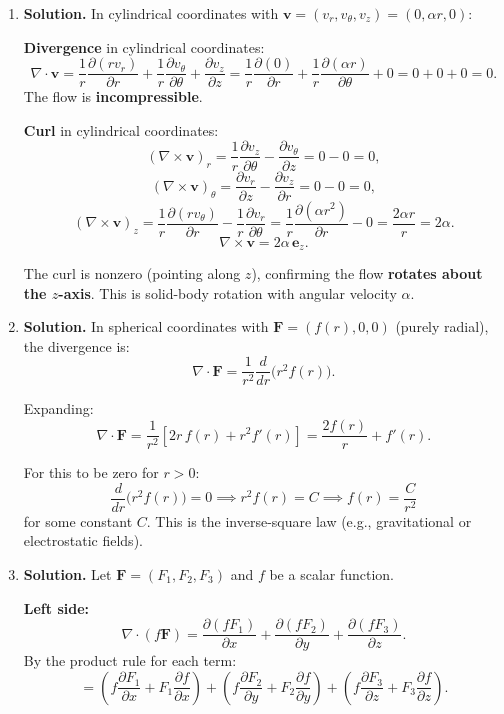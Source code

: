 \begin{enumerate}
\emph{Note:} The problem statement suggests the curl is nonzero, but computation shows both are zero. The field is both divergence-free and irrotational.

\item \textbf{Solution.}
In cylindrical coordinates with $\mathbf{v}=(v_r, v_\theta, v_z)=(0,\alpha r, 0)$:

\textbf{Divergence} in cylindrical coordinates:
\[
\nabla\cdot\mathbf{v} = \frac{1}{r}\frac{\partial(rv_r)}{\partial r}+\frac{1}{r}\frac{\partial v_\theta}{\partial\theta}+\frac{\partial v_z}{\partial z} = \frac{1}{r}\frac{\partial(0)}{\partial r}+\frac{1}{r}\frac{\partial(\alpha r)}{\partial\theta}+0 = 0+0+0 = \boxed{0}.
\]
The flow is \textbf{incompressible}.

\textbf{Curl} in cylindrical coordinates:
\[
(\nabla\times\mathbf{v})_r = \frac{1}{r}\frac{\partial v_z}{\partial\theta}-\frac{\partial v_\theta}{\partial z} = 0-0=0,
\]
\[
(\nabla\times\mathbf{v})_\theta = \frac{\partial v_r}{\partial z}-\frac{\partial v_z}{\partial r} = 0-0=0,
\]
\[
(\nabla\times\mathbf{v})_z = \frac{1}{r}\frac{\partial(rv_\theta)}{\partial r}-\frac{1}{r}\frac{\partial v_r}{\partial\theta} = \frac{1}{r}\frac{\partial(\alpha r^2)}{\partial r}-0 = \frac{2\alpha r}{r} = 2\alpha.
\]
\[
\nabla\times\mathbf{v} = \boxed{2\alpha\,\mathbf{e}_z}.
\]

The curl is nonzero (pointing along $z$), confirming the flow \textbf{rotates about the $z$-axis}. This is solid-body rotation with angular velocity $\alpha$.

\item \textbf{Solution.}
In spherical coordinates with $\mathbf{F}=(f(r),0,0)$ (purely radial), the divergence is:
\[
\nabla\cdot\mathbf{F} = \frac{1}{r^2}\frac{d}{dr}\bigl(r^2 f(r)\bigr).
\]

Expanding:
\[
\nabla\cdot\mathbf{F} = \frac{1}{r^2}\left[2r\,f(r)+r^2 f'(r)\right] = \frac{2f(r)}{r}+f'(r).
\]

For this to be zero for $r>0$:
\[
\frac{d}{dr}\bigl(r^2 f(r)\bigr)=0 \implies r^2 f(r)=C \implies \boxed{f(r)=\frac{C}{r^2}}
\]
for some constant $C$. This is the inverse-square law (e.g., gravitational or electrostatic fields).

\item \textbf{Solution.}
Let $\mathbf{F}=(F_1,F_2,F_3)$ and $f$ be a scalar function.

\textbf{Left side:}
\[
\nabla\cdot(f\mathbf{F}) = \frac{\partial(fF_1)}{\partial x}+\frac{\partial(fF_2)}{\partial y}+\frac{\partial(fF_3)}{\partial z}.
\]
By the product rule for each term:
\[
= \left(f\frac{\partial F_1}{\partial x}+F_1\frac{\partial f}{\partial x}\right)+\left(f\frac{\partial F_2}{\partial y}+F_2\frac{\partial f}{\partial y}\right)+\left(f\frac{\partial F_3}{\partial z}+F_3\frac{\partial f}{\partial z}\right).
\]


\end{enumerate}
